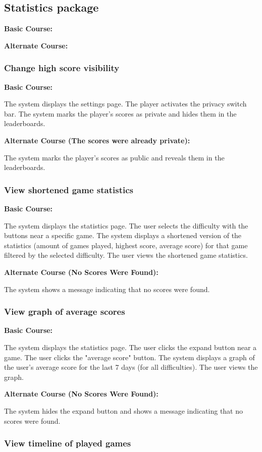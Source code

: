 \documentclass[11pt,a4paper]{article}
\newcommand{\heading}[1]{\vspace{1em}\noindent\textbf{#1}\par\vspace{0.5em}}
\begin{document}
\subsection{Statistics package}
\heading{Basic Course:}

\heading{Alternate Course:}

\subsubsection{Change high score visibility}

\heading{Basic Course:}
The system displays the settings page. The player activates the privacy switch bar. The system marks the player's scores as private and hides them in the leaderboards.

\heading{Alternate Course (The scores were already private):}
The system marks the player's scores as public and reveals them in the leaderboards.

\subsubsection{View shortened game statistics}

\heading{Basic Course:}
The system displays the statistics page. The user selects the difficulty with the buttons near a specific game. The system displays a shortened version of the statistics (amount of games played, highest score, average score) for that game filtered by the selected difficulty. The user views the shortened game statistics.

\heading{Alternate Course (No Scores Were Found):}
The system shows a message indicating that no scores were found.

\subsubsection{View graph of average scores}

\heading{Basic Course:}
The system displays the statistics page. The user clicks the expand button near a game. The user clicks the "average score" button. The system displays a graph of the user's average score for the last 7 days (for all difficulties). The user views the graph.

\heading{Alternate Course (No Scores Were Found):}
The system hides the expand button and shows a message indicating that no scores were found.

\subsubsection{View timeline of played games}
\end{document}
